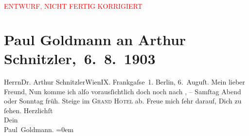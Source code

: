 
\begin{center}
            \textcolor{red}{ENTWURF, NICHT FERTIG KORRIGIERT}
                      \end{center}
            
         \renewcommand{\erwaehnteOrte}{Orte: Berlin, Frankgasse, Grand Hotel Wien, Wien}
         \renewcommand{\erwaehnteWerke}{}
               \section[ Paul Goldmann an Arthur Schnitzler, 6. 8. 1903]{ Paul Goldmann an Arthur Schnitzler, 6. 8. 1903}\nopagebreak{}\rehead{ }\begin{ledgroupsized}[t]{13cm}\normalsize\beginnumbering \toendnotes[C]{\smallbreak\pagebreak[2]} 
\toendnotes[C]{\smallbreak}\pstart{}{\pb}Herrn\pend{}\pstart{}Dr. Arthur Schnitzler\pend{}\pstart{}Wien\pend{}\pstart{}IX. Frankgaſse 1.\pend{}{\bigskip}\pstart
           {\pb}Berlin, 6. Auguſt.\pend
           \pstart{}Mein lieber Freund,\pend\pstart
           Nun komme ich alſo vorausſichtlich doch noch nach \label{K_L03381-1v}\label{K_L03381-1h}, – Samſtag{ }Abend oder Sonntag{ }früh. Steige im \textsc{Grand Hotel} ab. Freue mich ſehr darauf, Dich zu ſehen.\pend
           \pstart
           Herzlichſt {\\[\baselineskip]}Dein {\\[\baselineskip]}\spacefill\mbox{Paul Goldmann.}\pend
           \leftskip=0em{}
         
         \endnumbering{}\end{ledgroupsized}\begin{anhang}\end{anhang}\newcommand{\dateiname}{L03381}\newcommand{\titel}{Paul Goldmann an Arthur Schnitzler, 6. 8. 1903}\newcommand{\editorInnen}{Martin Anton Müller und Laura Untner}
      